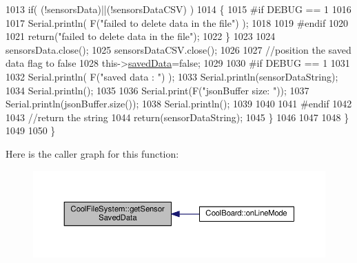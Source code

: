 \begin{DoxyCode}
1013             \textcolor{keywordflow}{if}( (!sensorsData)||(!sensorsDataCSV) ) 
1014             \{
1015 \textcolor{preprocessor}{            #if DEBUG == 1}
1016         
1017                 Serial.println( F(\textcolor{stringliteral}{"failed to delete data in the file"}) );
1018         
1019 \textcolor{preprocessor}{            #endif}
1020 
1021                 \textcolor{keywordflow}{return}(\textcolor{stringliteral}{"failed to delete data in the file"});
1022             \}
1023 
1024             sensorsData.close();
1025             sensorsDataCSV.close();
1026 
1027             \textcolor{comment}{//position the saved data flag to false}
1028             this->\hyperlink{classCoolFileSystem_ad398e0c5c41a0c88acdf5d672aa71351}{savedData}=\textcolor{keyword}{false}; 
1029             
1030 \textcolor{preprocessor}{        #if DEBUG == 1 }
1031 
1032             Serial.println( F(\textcolor{stringliteral}{"saved data : "}) );
1033             Serial.println(sensorDataString);
1034             Serial.println();
1035 
1036             Serial.print(F(\textcolor{stringliteral}{"jsonBuffer size: "}));
1037             Serial.println(jsonBuffer.size());
1038             Serial.println();
1039 
1040         
1041 \textcolor{preprocessor}{        #endif}
1042 
1043             \textcolor{comment}{//return the string}
1044             \textcolor{keywordflow}{return}(sensorDataString);       
1045         \}
1046         
1047         
1048     \}
1049 
1050 \}
\end{DoxyCode}
Here is the caller graph for this function\+:\nopagebreak
\begin{figure}[H]
\begin{center}
\leavevmode
\includegraphics[width=350pt]{classCoolFileSystem_a5c58bca3735c0ed3efb268d70ef998ef_icgraph}
\end{center}
\end{figure}
\mbox{\label{classCoolFileSystem_a5a7eaeea7a9fbf8aaef651d862fa3b5b}} 
